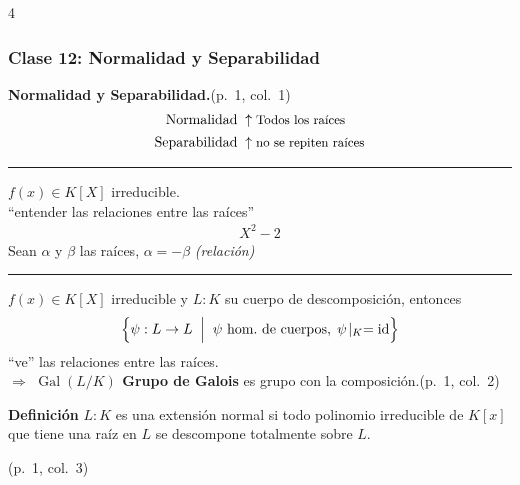 \documentclass[landscape,a4paper]{article}
\begin{document}
\begin{multicols}{4}
\subsubsection*{Clase 12: Normalidad y Separabilidad}

\noindent\textbf{Normalidad y Separabilidad.}\hfill(p.~1, col.~1)\\[-0.25em]
\begin{align*}
\text{Normalidad}\;\uparrow\; &\text{\small Todos los raíces}\\[1pt]
\text{Separabilidad}\;\uparrow\; &\text{\small no se repiten raíces}
\end{align*}
\rule{\linewidth}{0.3pt}

$f(x)\in K[X]$ irreducible.\\
“entender las relaciones entre las raíces”\\[0.25em]
\begin{align*}
X^{2}-2
\end{align*}
Sean $\alpha$ y $\beta$ las raíces,\;
\underline{$\alpha=-\beta$} \emph{(relación)}\\
\rule{\linewidth}{0.3pt}

$f(x)\in K[X]$ irreducible y $L:K$ su cuerpo de descomposición, entonces
\begin{align*}
\Bigl\{\psi:L\to L \;\Bigm|\; \psi\text{ hom.\ de cuerpos},\;
\psi\!\mid_{K}=\mathrm{id}\Bigr\}
\end{align*}
“ve” las relaciones entre las raíces.\\[-0.3em]

\noindent$\Longrightarrow$ \textbf{$\operatorname{Gal}(L/K)$ Grupo de Galois} es grupo con la composición.\hfill(p.~1, col.~2)

\begin{tcolorbox}[title={Extensiones Normales},colback=white,
                 colframe=blue!80!black,colbacktitle=blue!80!black,coltitle=white]
\textbf{Definición}\;
$L:K$ es una extensión normal si todo polinomio irreducible de $K[x]$
que tiene una raíz en $L$ se descompone totalmente sobre $L$.
\end{tcolorbox}\hfill(p.~1, col.~3)


\end{multicols}
\end{document}
